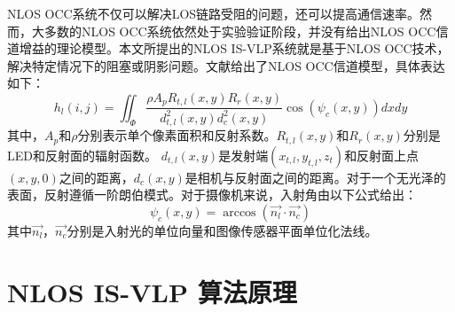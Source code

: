 NLOS OCC系统不仅可以解决LOS链路受阻的问题，还可以提高通信速率。然而，大多数的NLOS OCC系统依然处于实验验证阶段，并没有给出NLOS OCC信道增益的理论模型。本文所提出的NLOS IS-VLP系统就是基于NLOS OCC技术，解决特定情况下的阻塞或阴影问题。文献\parencite{nlos-channel-model}给出了NLOS OCC信道模型，具体表达如下：
\begin{equation} \label{hlij}
h_{l}(i,j)=\iint _{\Phi}\frac{\rho A_{p}R_{t,l}(x,y)R_{r}(x,y)}{d^{2}_{t,l}(x,y)d^{2}_{c}(x,y)} \cos (\psi _{c}(x,y))dxdy
\end{equation}
其中，$A_p$和$\rho$分别表示单个像素面积和反射系数。$R_{t,l}(x, y)$和$R_{r}(x, y)$分别是LED和反射面的辐射函数。
$d_{t,l}(x, y)$是发射端$(x_{t,l}, y_{t,l}, z_t)$和反射面上点$(x, y, 0)$之间的距离，$d_{c}(x, y)$是相机与反射面之间的距离。对于一个无光泽的表面，反射遵循一阶朗伯模式。对于摄像机来说，入射角由以下公式给出：
\begin{equation} \label{phicxy}
  \psi _{c}(x,y)=\arccos(\vec{n_{l}}\cdot \vec{n_{c}})
\end{equation}
其中$\vec{n_l}$，$\vec{n_c}$分别是入射光的单位向量和图像传感器平面单位化法线。



\section{NLOS IS-VLP 算法原理}

